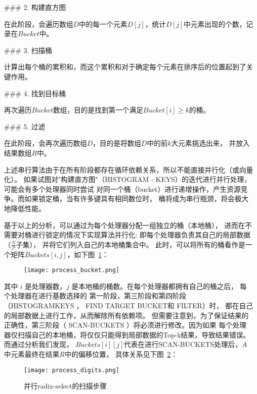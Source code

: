   ### 2. 构建直方图

 在此阶段，会遍历数组\(D\)中的每一个元素\(D[j]\)，统计\(D[j]\)中元素出现的个数，记录在\(Bucket\)中。
  
 ### 3. 扫描桶

 计算出每个桶的累积和，而这个累积和对于确定每个元素在排序后的位置起到了关键作用。

  ### 4. 找到目标桶

再次遍历\(Bucket\)数组，目的是找到第一个满足\(Bucket[i] \geq k\)的桶。

  ### 5. 过滤

  在此阶段，会再次遍历数组\(D\)，目的是将数组\(D\)中的前\(k\)大元素挑选出来，
  并放入结果数组\(R\)中。

  上述串行算法由于在所有阶段都存在循环依赖关系，所以不能直接并行化（或向量化）。
  如果试图对"构建直方图"（HISTOGRAM - KEYS）的迭代进行并行处理，可能会有多个处理器同时尝试
  对同一个桶（bucket）进行递增操作，产生资源竞争。而如果锁定桶，当有许多键具有相同数位时，
  桶将成为串行瓶颈，将会极大地降低性能。

  基于以上的分析，可以通过为每个处理器分配一组独立的桶（本地桶），
进而在不需要对桶进行锁定的情况下实现算法并行化:
即每个处理器负责其自己的局部数据（\(\frac{N}{P}\)子集），
并将它们列入自己的本地桶集合中。
此时，可以将所有的桶看作是一个矩阵\(Buckets[i, j]\)，如下图~\ref{fig:process_bucket}：

\begin{figure}[ht]
    \centering
    \texttt{[image: process\_bucket.png]}
    \caption{}
    \label{fig:process_bucket}
\end{figure}

其中 $i$ 是处理器数，$j$ 是本地桶的桶数。在每个处理器都拥有自己的桶之后，
每个处理器在进行基数选择的
第一阶段，第三阶段和第四阶段（HISTOGRAMKEYS ， FIND TARGET BUCKET和 FILTER）时，
都在自己的局部数据上进行工作，从而解除所有依赖项。
但需要注意到，为了保证结果的正确性，第三阶段（ SCAN-BUCKETS ）将必须进行修改。因为如果
每个处理器仅扫描自己的本地桶，将仅仅只能得到局部数据的Top-k结果，导致结果错误。而通过分析我们发现，
$Buckets[i][j]$代表在进行SCAN-BUCKETS处理后，$A$中元素最终在结果$R$中的偏移位置，
具体关系见下图~\ref{fig:digits}：
\begin{figure}[ht]
    \centering
    \texttt{[image: process\_digits.png]}
    \caption{并行radix-select的扫描步骤}
    \label{fig:digits}
\end{figure}

